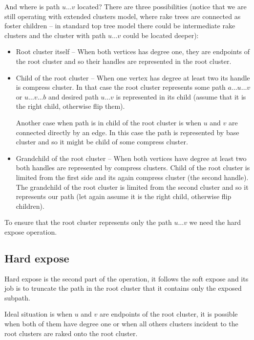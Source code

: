 And where is path $u\dots v$ located? There are three possibilities (notice that
we are still operating with extended clusters model, where rake trees are
connected as foster children -- in standard top tree model there could be
intermediate rake clusters and the cluster with path $u\dots v$ could be located
deeper):

\begin{itemize}

\item Root cluster itself -- When both vertices has degree one, they are endpoints
of the root cluster and so their handles are represented in the root cluster.

\item Child of the root cluster -- When one vertex has degree at least two its
handle is compress cluster. In that case the root cluster represents some path
$a\dots u\dots v$ or $u\dots v\dots b$ and desired path $u\dots v$ is
represented in its child (assume that it is the right child, otherwise flip them).

Another case when path is in child of the root cluster is when $u$ and $v$ are
connected directly by an edge. In this case the path is represented by base cluster
and so it might be child of some compress cluster.

\item Grandchild of the root cluster -- When both vertices have degree at least
two both handles are represented by compress clusters. Child of the root cluster
is limited from the first side and its again compress cluster (the second handle).
The grandchild of the root cluster is limited from the second cluster and so it
represents our path (let again assume it is the right child, otherwise flip
children).

\end{itemize}

To ensure that the root cluster represents only the path $u\dots v$ we need the
hard expose operation.

\subsection{Hard expose}

Hard expose is the second part of the \Expose{} operation, it follows the soft
expose and its job is to truncate the path in the root cluster that it contains
only the exposed subpath.

Ideal situation is when $u$ and $v$ are endpoints of the root cluster, it is
possible when both of them have degree one or when all others clusters incident
to the root clusters are raked onto the root cluster.

